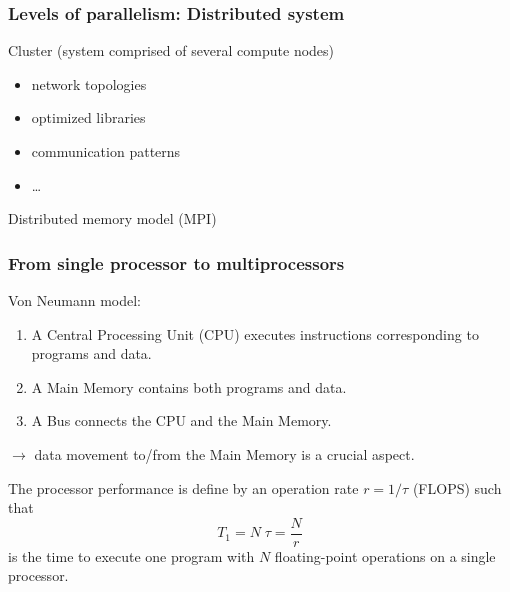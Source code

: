 \begin{frame}
  \frametitle{Levels of parallelism: Distributed system}


Cluster (system comprised of several compute nodes)
\begin{itemize}
\item network topologies
\item optimized libraries
\item communication patterns
\item \dots
\end{itemize}
\begin{center}
Distributed memory model (MPI)
\end{center}

\end{frame}

\begin{frame}
  \frametitle{From single processor to multiprocessors}

Von Neumann model:
  \begin{center}
    \scalebox{0.8}{
      
    }
  \end{center}
\medskip
\begin{enumerate}
\item A Central Processing Unit (CPU) executes instructions corresponding to programs and data.
\item A Main Memory contains both programs and data.
\item A Bus connects the CPU and the Main Memory.
\end{enumerate}
$\rightarrow$ data movement to/from the Main Memory is a crucial aspect.

\medskip
The processor performance is define by an operation rate $r = 1/\tau$ (FLOPS) such that
\begin{equation*}
T_1 = N\; \tau = \dfrac{N}{r} 
\end{equation*}
is the time to execute one program with $N$ floating-point operations on a single processor.

\end{frame}

